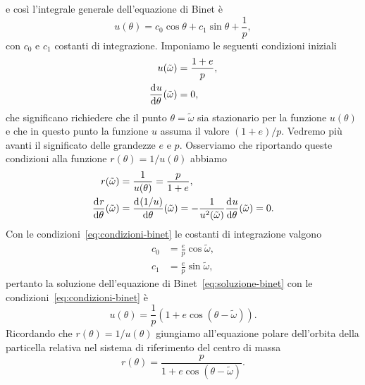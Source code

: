 e così l'integrale generale dell'equazione di Binet è
\begin{equation}
  \label{eq:soluzione-binet}
  u(\theta) = c_0\cos\theta + c_1\sin\theta + \frac{1}{p},
\end{equation}
con $c_0$ e $c_1$ costanti di integrazione. Imponiamo le seguenti condizioni
iniziali
\begin{subequations}
  \label{eq:condizioni-binet}
  \begin{align}
    u(\tilde\omega) &= \frac{1+e}{p},\\
    \frac{{\mathop{}\!\mathrm{d}^{}}u}{\mathop{}\!\mathrm{d} {\theta}^{}}(\tilde\omega) &= 0,
  \end{align}
\end{subequations}
che significano richiedere che il punto $\theta = \tilde\omega$ sia stazionario
per la funzione $u(\theta)$ e che in questo punto la funzione $u$ assuma il
valore $(1+e)/p$. Vedremo più avanti il significato delle grandezze $e$ e
$p$. Osserviamo che riportando queste condizioni alla funzione
$r(\theta)=1/u(\theta)$ abbiamo
\begin{subequations}
  \begin{align}
    r(\tilde\omega) &= \frac{1}{u(\theta)} = \frac{p}{1+e}, \\
    \frac{{\mathop{}\!\mathrm{d}^{}}r}{\mathop{}\!\mathrm{d} {\theta}^{}}(\tilde\omega) &= \frac{{\mathop{}\!\mathrm{d}^{}}(1/u)}{\mathop{}\!\mathrm{d} {\theta}^{}}(\tilde\omega) =
    -\frac{1}{u^2(\tilde\omega)} \frac{{\mathop{}\!\mathrm{d}^{}}u}{\mathop{}\!\mathrm{d} {\theta}^{}}(\tilde\omega) =  0.
  \end{align}
\end{subequations}
Con le condizioni~\eqref{eq:condizioni-binet} le costanti di integrazione
valgono
\begin{subequations}
  \label{eq:costanti-binet}
  \begin{align}
    c_0 &= \frac{e}{p}\cos\tilde\omega, \\
    c_1 &= \frac{e}{p}\sin\tilde\omega,
  \end{align}
\end{subequations}
pertanto la soluzione dell'equazione di Binet~\eqref{eq:soluzione-binet} con le
condizioni~\eqref{eq:condizioni-binet} è
\begin{equation}
  u(\theta) = \frac{1}{p}(1+e\cos(\theta-\tilde\omega)).
\end{equation}
Ricordando che $r(\theta)=1/u(\theta)$ giungiamo all'equazione polare
dell'orbita della particella relativa nel sistema di riferimento del centro di
massa
\begin{equation}
  \label{eq:orbita}
  r(\theta) = \frac{p}{1+e\cos(\theta-\tilde\omega)}.
\end{equation}

